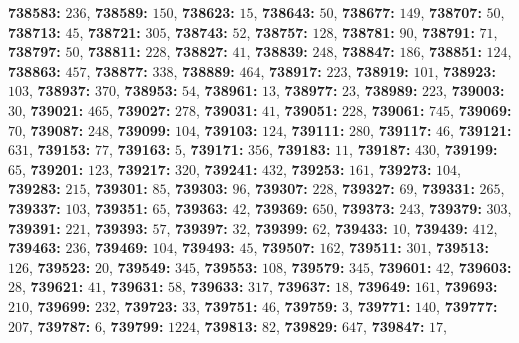 \textsf{\bfseries 738583:} $236$, \textsf{\bfseries 738589:} $150$, \textsf{\bfseries 738623:} $15$, \textsf{\bfseries 738643:} $50$, \textsf{\bfseries 738677:} $149$, \textsf{\bfseries 738707:} $50$, \textsf{\bfseries 738713:} $45$, \textsf{\bfseries 738721:} $305$, \textsf{\bfseries 738743:} $52$, \textsf{\bfseries 738757:} $128$, \textsf{\bfseries 738781:} $90$, \textsf{\bfseries 738791:} $71$, \textsf{\bfseries 738797:} $50$, \textsf{\bfseries 738811:} $228$, \textsf{\bfseries 738827:} $41$, \textsf{\bfseries 738839:} $248$, \textsf{\bfseries 738847:} $186$, \textsf{\bfseries 738851:} $124$, \textsf{\bfseries 738863:} $457$, \textsf{\bfseries 738877:} $338$, \textsf{\bfseries 738889:} $464$, \textsf{\bfseries 738917:} $223$, \textsf{\bfseries 738919:} $101$, \textsf{\bfseries 738923:} $103$, \textsf{\bfseries 738937:} $370$, \textsf{\bfseries 738953:} $54$, \textsf{\bfseries 738961:} $13$, \textsf{\bfseries 738977:} $23$, \textsf{\bfseries 738989:} $223$, \textsf{\bfseries 739003:} $30$, \textsf{\bfseries 739021:} $465$, \textsf{\bfseries 739027:} $278$, \textsf{\bfseries 739031:} $41$, \textsf{\bfseries 739051:} $228$, \textsf{\bfseries 739061:} $745$, \textsf{\bfseries 739069:} $70$, \textsf{\bfseries 739087:} $248$, \textsf{\bfseries 739099:} $104$, \textsf{\bfseries 739103:} $124$, \textsf{\bfseries 739111:} $280$, \textsf{\bfseries 739117:} $46$, \textsf{\bfseries 739121:} $631$, \textsf{\bfseries 739153:} $77$, \textsf{\bfseries 739163:} $5$, \textsf{\bfseries 739171:} $356$, \textsf{\bfseries 739183:} $11$, \textsf{\bfseries 739187:} $430$, \textsf{\bfseries 739199:} $65$, \textsf{\bfseries 739201:} $123$, \textsf{\bfseries 739217:} $320$, \textsf{\bfseries 739241:} $432$, \textsf{\bfseries 739253:} $161$, \textsf{\bfseries 739273:} $104$, \textsf{\bfseries 739283:} $215$, \textsf{\bfseries 739301:} $85$, \textsf{\bfseries 739303:} $96$, \textsf{\bfseries 739307:} $228$, \textsf{\bfseries 739327:} $69$, \textsf{\bfseries 739331:} $265$, \textsf{\bfseries 739337:} $103$, \textsf{\bfseries 739351:} $65$, \textsf{\bfseries 739363:} $42$, \textsf{\bfseries 739369:} $650$, \textsf{\bfseries 739373:} $243$, \textsf{\bfseries 739379:} $303$, \textsf{\bfseries 739391:} $221$, \textsf{\bfseries 739393:} $57$, \textsf{\bfseries 739397:} $32$, \textsf{\bfseries 739399:} $62$, \textsf{\bfseries 739433:} $10$, \textsf{\bfseries 739439:} $412$, \textsf{\bfseries 739463:} $236$, \textsf{\bfseries 739469:} $104$, \textsf{\bfseries 739493:} $45$, \textsf{\bfseries 739507:} $162$, \textsf{\bfseries 739511:} $301$, \textsf{\bfseries 739513:} $126$, \textsf{\bfseries 739523:} $20$, \textsf{\bfseries 739549:} $345$, \textsf{\bfseries 739553:} $108$, \textsf{\bfseries 739579:} $345$, \textsf{\bfseries 739601:} $42$, \textsf{\bfseries 739603:} $28$, \textsf{\bfseries 739621:} $41$, \textsf{\bfseries 739631:} $58$, \textsf{\bfseries 739633:} $317$, \textsf{\bfseries 739637:} $18$, \textsf{\bfseries 739649:} $161$, \textsf{\bfseries 739693:} $210$, \textsf{\bfseries 739699:} $232$, \textsf{\bfseries 739723:} $33$, \textsf{\bfseries 739751:} $46$, \textsf{\bfseries 739759:} $3$, \textsf{\bfseries 739771:} $140$, \textsf{\bfseries 739777:} $207$, \textsf{\bfseries 739787:} $6$, \textsf{\bfseries 739799:} $1224$, \textsf{\bfseries 739813:} $82$, \textsf{\bfseries 739829:} $647$, \textsf{\bfseries 739847:} $17$, 
